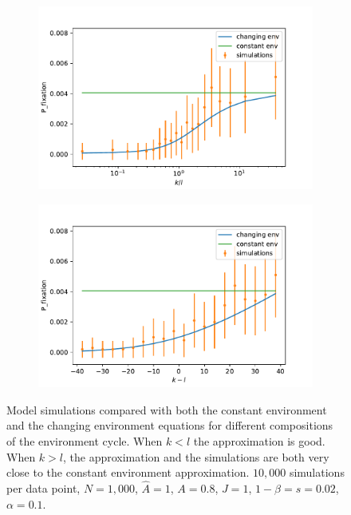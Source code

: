 \documentclass[12pt]{extarticle}
\begin{document}
\begin{figure}[t]
  \begin{center}
  \begin{subfigure}[a]{0.49\linewidth}
  \caption{}
    \includegraphics[width=\linewidth]{../figures/changed_env/ch_env_var_k_div_l.pdf}
   \end{subfigure}
   \begin{subfigure}[a]{0.49\linewidth}
   \caption{}
    \includegraphics[width=\linewidth]{../figures/changed_env/ch_env_var_k_min_l.pdf}
   \end{subfigure}
  \end{center}
  \caption{Model simulations compared with both the constant environment and the changing environment equations for different compositions of the environment cycle. When $k<l$ the approximation is good. When $k>l$, the approximation and the simulations are both very close to the constant environment approximation. 
  $10,000$ simulations per data point, $N=1,000$, $\hat{A}=1$, $A=0.8$, $J=1$, $1-\beta=s=0.02$, $\alpha=0.1$.}
  \label{fig:ch_env_k_l}
\end{figure}
\end{document}
